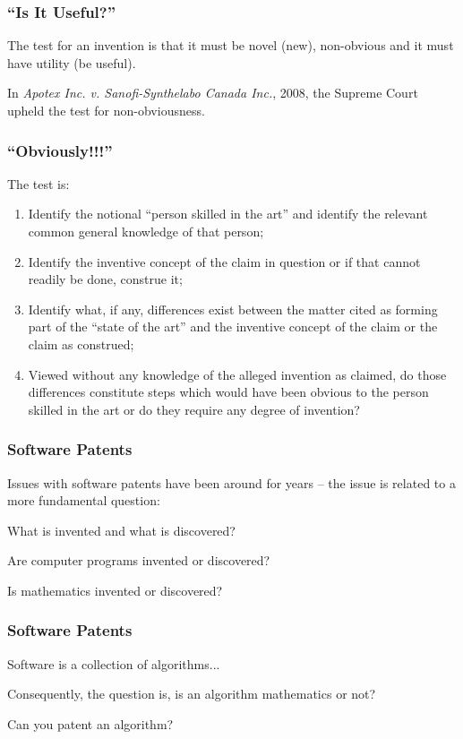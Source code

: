 \begin{frame}
\frametitle{``Is It Useful?''}

The test for an invention is that it must be novel (new), non-obvious and it must have utility (be useful).

In  \textit{Apotex Inc. v. Sanofi-Synthelabo Canada Inc.}, 2008, the Supreme Court upheld the test for non-obviousness.

\end{frame}



\begin{frame}
\frametitle{``Obviously!!!''}

The test is:

\begin{enumerate}
\item Identify the notional ``person skilled in the art'' and identify the relevant common general knowledge of that person;
\item Identify the inventive concept of the claim in question or if that cannot readily be done, construe it;
\item Identify what, if any, differences exist between the matter cited as forming part of the ``state of the art'' and the inventive concept of the claim or the claim as construed;
\item Viewed without any knowledge of the alleged invention as claimed, do those differences constitute steps which would have been obvious to the person skilled in the art or do they require any degree of invention?
\end{enumerate}

\end{frame}



\begin{frame}
\frametitle{Software Patents}

Issues with software patents have  been around for years -- the issue is related to a more fundamental question:

What is invented and what is discovered?

Are computer programs invented or discovered?

Is mathematics invented or discovered?

\end{frame}



\begin{frame}
\frametitle{Software Patents}

Software is a collection of algorithms...

Consequently, the question is, is an algorithm mathematics or not?

Can you patent an algorithm?
\end{frame}



